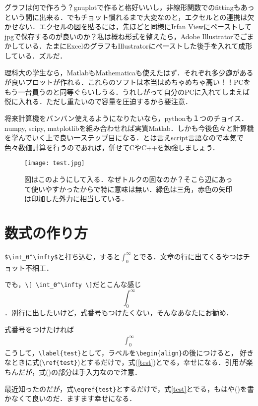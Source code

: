 \documentclass[12 pt,a4paper,autodetect-engine]{jsarticle}
\begin{document}
グラフは何で作ろう？gnuplotで作ると格好いいし，非線形関数でのfittingもあっという間に出来る．でもチョット慣れるまで大変なのと，エクセルとの連携は欠かせない．エクセルの図を貼るには，先ほどと同様にIrfan Viewにペーストしてjpgで保存するのが良いのか？私は概ね形式を整えたら，Adobe Illustratorでごまかしている．たまにExcelのグラフもIllustratorにペーストした後手を入れて成形している．ズルだ．

理科大の学生なら，MatlabもMathematicaも使えたはず．それぞれ多少癖があるが良いプロットが作れる．これらのソフトは本当はめちゃめちゃ高い！！PCをもう一台買うのと同等ぐらいしうる．うれしがって自分のPCに入れてしまえば悦に入れる．ただし重たいので容量を圧迫するから要注意．

将来計算機をバンバン使えるようになりたいなら，pythonも１つのチョイス．numpy, scipy, matplotlibを組み合わせれば実質Matlab．しかも今後色々と計算機を学んでいく上で良い一ステップ目になる．とは言えscript言語なので本気で色々数値計算を行うのであれば，併せてCやC++を勉強しましょう．


\begin{figure}[hbt]
	\begin{center}
	\texttt{[image: test.jpg]}
	\caption{図はこのようにして入る．なぜトルクの図なのか？そこら辺にあって使いやすかったからで特に意味は無い．緑色は三角，赤色の矢印は印加した外力に相当している．}
	\end{center}
\end{figure}


\section{数式の作り方}\label{chapter}
\verb|$\int_0^\infty$|と打ち込む，すると$\int_0^\infty$とでる．文章の行に出てくるやつはチョット不細工．

でも，\verb|\[ \int_0^\infty \]|だとこんな感じ\[ \int_0^\infty \]．別行に出したいけど，式番号もつけたくない，そんなあなたにお勧め．

式番号をつけたければ
\begin{align}\label{test}
\int_0^\infty
\end{align}
こうして，\verb|\label{test}|として，ラベルを\verb|\begin{align}|の後につけると，
好きなときに式(\verb|\ref{test}|)とするだけで，式(\ref{test})とでる，幸せになる．引用が楽ちんだが，式()の部分は手入力なので注意．

最近知ったのだが，式\verb|\eqref{test}|とするだけで，式\eqref{test}とでる，もはや()を書かなくて良いのだ．ますます幸せになる．
\end{document}
